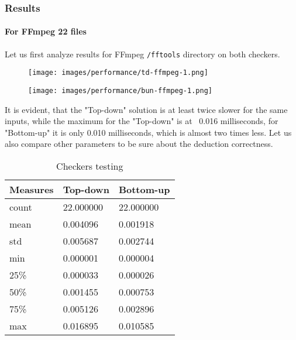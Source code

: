 \subsubsection{Results}

\paragraph{For FFmpeg 22 files \\}

Let us first analyze results for FFmpeg \lstinline{/fftools} directory on both checkers. 

\begin{figure}[H]
\centering
\begin{minipage}{.5\textwidth}
  \centering
  \texttt{[image: images/performance/td-ffmpeg-1.png]}
  \label{fig:perf-ffmpeg-td}
\end{minipage}%
\begin{minipage}{.5\textwidth}
  \centering
  \texttt{[image: images/performance/bun-ffmpeg-1.png]}
  \label{fig:perf-ffmpeg-bu}
\end{minipage}
\end{figure}

It is evident, that the "Top-down" solution is at least twice slower for the same inputs, while the maximum for the "Top-down" is at ~0.016 milliseconds, for "Bottom-up" it is only 0.010 milliseconds, which is almost two times less. Let us also compare other parameters to be sure about the deduction correctness.

\begin{table}[H]
    \centering
    \begin{tabular}{|m{}|m{}|m{}|}
        \hline
        \textbf{Measures} & \textbf{Top-down} & \textbf{Bottom-up}  \\
        \hline
        count  &   22.000000 & 22.000000 \\
        mean   &  0.004096 & 0.001918 \\
        std    &   0.005687 & 0.002744 \\
        min    &   0.000001 & 0.000004 \\
        25\%    &   0.000033 & 0.000026 \\
        50\%    &   0.001455 & 0.000753 \\
        75\%    &   0.005126 & 0.002896 \\
        max    &   0.016895 & 0.010585 \\
        \hline 
    \end{tabular}
    \caption{Checkers testing}
    \label{tab:perf-test-res}
\end{table}

